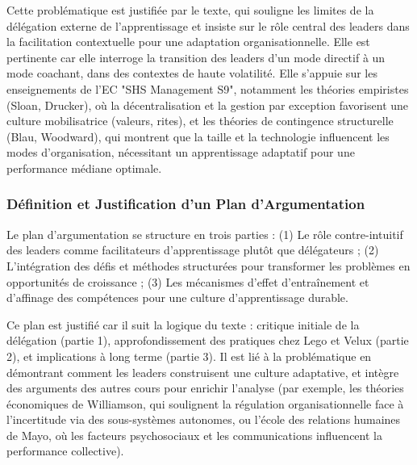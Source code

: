 \documentclass{rapportECL}
\begin{document}
Cette problématique est justifiée par le texte, qui souligne les limites de la délégation externe de l'apprentissage et insiste sur le rôle central des leaders dans la facilitation contextuelle pour une adaptation organisationnelle. Elle est pertinente car elle interroge la transition des leaders d'un mode directif à un mode coachant, dans des contextes de haute volatilité. Elle s’appuie sur les enseignements de l’EC "SHS Management S9", notamment les théories empiristes (Sloan, Drucker), où la décentralisation et la gestion par exception favorisent une culture mobilisatrice (valeurs, rites), et les théories de contingence structurelle (Blau, Woodward), qui montrent que la taille et la technologie influencent les modes d'organisation, nécessitant un apprentissage adaptatif pour une performance médiane optimale.

\subsubsection{Définition et Justification d’un Plan d’Argumentation}
Le plan d’argumentation se structure en trois parties : (1) Le rôle contre-intuitif des leaders comme facilitateurs d'apprentissage plutôt que délégateurs ; (2) L'intégration des défis et méthodes structurées pour transformer les problèmes en opportunités de croissance ; (3) Les mécanismes d'effet d'entraînement et d'affinage des compétences pour une culture d'apprentissage durable.

Ce plan est justifié car il suit la logique du texte : critique initiale de la délégation (partie 1), approfondissement des pratiques chez Lego et Velux (partie 2), et implications à long terme (partie 3). Il est lié à la problématique en démontrant comment les leaders construisent une culture adaptative, et intègre des arguments des autres cours pour enrichir l'analyse (par exemple, les théories économiques de Williamson, qui soulignent la régulation organisationnelle face à l'incertitude via des sous-systèmes autonomes, ou l'école des relations humaines de Mayo, où les facteurs psychosociaux et les communications influencent la performance collective).
\end{document}
